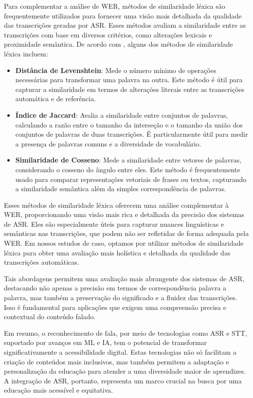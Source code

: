 Para complementar a análise de WER, métodos de similaridade léxica são frequentemente utilizados para fornecer uma visão mais detalhada da qualidade das transcrições geradas por ASR. Esses métodos avaliam a similaridade entre as transcrições com base em diversos critérios, como alterações lexicais e proximidade semântica. De acordo com \cite{Majumdar2022}, alguns dos métodos de similaridade léxica incluem:

\begin{itemize}
\item \textbf{Distância de Levenshtein}: Mede o número mínimo de operações necessárias para transformar uma palavra na outra. Este método é útil para capturar a similaridade em termos de alterações literais entre as transcrições automática e de referência.
\item \textbf{Índice de Jaccard}: Avalia a similaridade entre conjuntos de palavras, calculando a razão entre o tamanho da interseção e o tamanho da união dos conjuntos de palavras de duas transcrições. É particularmente útil para medir a presença de palavras comuns e a diversidade de vocabulário.
\item \textbf{Similaridade de Cosseno}: Mede a similaridade entre vetores de palavras, considerando o cosseno do ângulo entre eles. Este método é frequentemente usado para comparar representações vetoriais de frases ou textos, capturando a similaridade semântica além da simples correspondência de palavras.
\end{itemize}

Esses métodos de similaridade léxica oferecem uma análise complementar à WER, proporcionando uma visão mais rica e detalhada da precisão dos sistemas de ASR. Eles são especialmente úteis para capturar nuances linguísticas e semânticas nas transcrições, que podem não ser refletidas de forma adequada pela WER. Em nossos estudos de caso, optamos por utilizar métodos de similaridade léxica para obter uma avaliação mais holística e detalhada da qualidade das transcrições automáticas.

Tais abordagens permitem uma avaliação mais abrangente dos sistemas de ASR, destacando não apenas a precisão em termos de correspondência palavra a palavra, mas também a preservação do significado e a fluidez das transcrições. Isso é fundamental para aplicações que exigem uma compreensão precisa e contextual do conteúdo falado.

Em resumo, o reconhecimento de fala, por meio de tecnologias como ASR e STT, suportado por avanços em ML e IA, tem o potencial de transformar significativamente a acessibilidade digital. Estas tecnologias não só facilitam a criação de conteúdos mais inclusivos, mas também permitem a adaptação e personalização da educação para atender a uma diversidade maior de aprendizes. A integração de ASR, portanto, representa um marco crucial na busca por uma educação mais acessível e equitativa.

